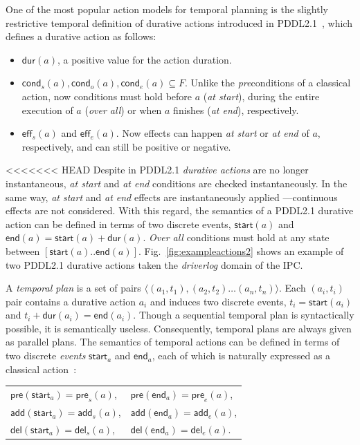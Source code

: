 \documentclass[runningheads]{llncs}
\newcommand{\tup}[1]{{\langle #1 \rangle}}
\newcommand{\pre}{\mathsf{pre}}    %
\newcommand{\eff}{\mathsf{eff}}    %
\newcommand{\cond}{\mathsf{cond}}  %
\newcommand{\dur}{\mathsf{dur}}    %
\newcommand{\start}{\mathsf{start}}%
\newcommand{\en}{\mathsf{end}}     %
\newcommand{\add}{\mathsf{add}}
\newcommand{\del}{\mathsf{del}}
\begin{document}
One of the most popular action models for temporal planning is the slightly restrictive temporal definition of durative actions introduced in PDDL2.1~\cite{fox2003pddl2}, which defines a durative action as follows:
\begin{itemize}
\item $\dur(a)$, a positive value for the action duration.
\item $\cond_s(a), \cond_o(a), \cond_e(a) \subseteq F$. Unlike the \emph{pre}conditions of a classical action, now conditions must hold before $a$ ({\em at start}), during the entire execution of $a$ ({\em over all}) or when $a$ finishes ({\em at end}), respectively.
\item $\eff_s(a)$ and $\eff_e(a)$. Now effects can happen {\em at start} or {\em at end} of $a$, respectively, and can still be positive or negative.
\end{itemize}

<<<<<<< HEAD
Despite in PDDL2.1 {\em durative actions} are no longer instantaneous, {\em at start} and {\em at end} conditions are checked instantaneously. In the same way, {\em at start} and {\em at end} effects are instantaneously applied ---continuous effects are not considered. With this regard, the semantics of a PDDL2.1 durative action can be defined in terms of two discrete events, $\start(a)$ and $\en(a)=\start(a)+\dur(a)$.
{\em Over all} conditions must hold at any state between $[\start(a)..\en(a)]$. Fig.~\ref{fig:exampleactions2} shows an example of two PDDL2.1 durative actions taken the \emph{driverlog} domain of the IPC.

A {\em temporal plan} is a set of pairs $\tup{(a_1,t_1),(a_2,t_2)\ldots (a_n,t_n)}$. Each $(a_i,t_i)$ pair contains a durative action $a_i$ and induces two discrete events, $t_i=\start(a_i)$ and $t_i+\dur(a_i)=\en(a_i)$. Though a sequential temporal plan is syntactically possible, it is semantically useless. Consequently, temporal plans are always given as parallel plans. The semantics of temporal actions can be defined in terms of two discrete \textit{events} $\mathsf{start}_a$ and $\mathsf{end}_a$, each of which is naturally expressed as a classical action~\cite{jimenez2015temporal}:

\vspace*{5pt}
\begin{tabular}{ll}
$\pre(\mathsf{start}_a) = \pre_s(a)$, & $\pre(\mathsf{end}_a) = \pre_e(a)$,\\[2pt]
$\add(\mathsf{start}_a) = \add_s(a)$, & $\add(\mathsf{end}_a) = \add_e(a)$,\\[2pt]
$\del(\mathsf{start}_a) = \del_s(a)$, & $\del(\mathsf{end}_a) = \del_e(a)$.
\end{tabular}
\vspace*{5pt}
\end{document}
